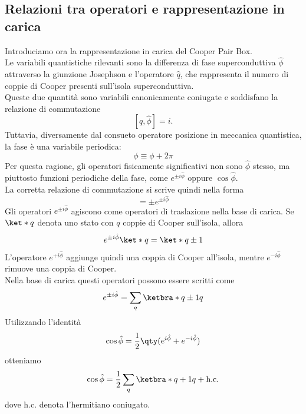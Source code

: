 \subsection{Relazioni tra operatori e rappresentazione in carica}
Introduciamo ora la rappresentazione in carica del Cooper Pair Box.\\
Le variabili quantistiche rilevanti sono la differenza di fase superconduttiva $\hat{\phi}$ attraverso la giunzione Josephson e l'operatore $\hat{q}$, che rappresenta il numero di coppie di Cooper presenti sull'isola superconduttiva.\\
Queste due quantità sono variabili canonicamente coniugate e soddisfano la relazione di commutazione
\[
[\hat{q},\hat{\phi}]=i.
\]
Tuttavia, diversamente dal consueto operatore posizione in meccanica quantistica, la fase è una variabile periodica:
\[
\phi \equiv \phi + 2\pi
\]
Per questa ragione, gli operatori fisicamente significativi non sono $\hat{\phi}$ stesso, ma piuttosto funzioni periodiche della fase, come $e^{\pm i\hat{\phi}}$ oppure $\cos\hat{\phi}$.\\
La corretta relazione di commutazione si scrive quindi nella forma
\begin{equation*}
    [\hat{q},e^{\pm i\hat{\phi}}]=\pm e^{\pm i\hat{\phi}}
\end{equation*}
Gli operatori $e^{\pm i\hat{\phi}}$ agiscono come operatori di traslazione nella base di carica. Se $\ket*{q}$ denota uno stato con $q$ coppie di Cooper sull'isola, allora
\begin{equation*}
    e^{\pm i\hat{\phi}} \ket*{q}=\ket*{q \pm 1}
\end{equation*}
L'operatore $e^{+i\hat{\phi}}$ aggiunge quindi una coppia di Cooper all'isola, mentre $e^{-i\hat{\phi}}$ rimuove una coppia di Cooper.\\
Nella base di carica questi operatori possono essere scritti come
\begin{equation*}
    e^{\pm i\hat{\phi}}=\sum_q \ketbra*{q \pm 1}{q}
\end{equation*}
Utilizzando l'identità
\begin{equation*}
    \cos\hat{\phi}
    =
    \frac{1}{2}
    \qty(
        e^{i\hat{\phi}}
        +
        e^{-i\hat{\phi}}
    )
\end{equation*}
otteniamo
\begin{equation*}
    \cos\hat{\phi}
    =
    \frac{1}{2}
    \sum_q
    \ketbra*{q+1}{q}
    +
    \text{h.c.}
\end{equation*}
dove h.c. denota l'hermitiano coniugato.\\
